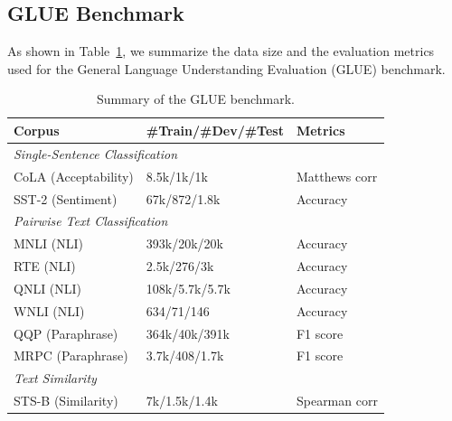 \documentclass{article}
\begin{document}
\begin{appendices}
\section{GLUE Benchmark}

As shown in Table~\ref{tbl:glue:datasets}, we summarize the data size and the evaluation metrics used for the General Language Understanding Evaluation (GLUE) benchmark.

\begin{table}[t]
\centering
\small
\begin{tabular}{@{\hskip3pt}l@{\hskip3pt} @{\hskip3pt}l@{\hskip3pt} @{\hskip3pt}l@{\hskip3pt}}
\toprule \textbf{Corpus} & \textbf{\#Train/\#Dev/\#Test}   &\textbf{Metrics}\\ \midrule
\multicolumn{3}{l}{\emph{Single-Sentence Classification}} \\
CoLA (Acceptability)&8.5k/1k/1k & Matthews corr\\
SST-2 (Sentiment)&67k/872/1.8k & Accuracy\\ \midrule
\multicolumn{3}{l}{\emph{Pairwise Text Classification}} \\
MNLI (NLI)& 393k/20k/20k& Accuracy\\
RTE (NLI) &2.5k/276/3k & Accuracy \\ 
QNLI (NLI)& 108k/5.7k/5.7k& Accuracy\\
WNLI (NLI) &634/71/146& Accuracy \\ 
QQP (Paraphrase)&364k/40k/391k& F1 score\\ 
MRPC (Paraphrase) &3.7k/408/1.7k&F1 score\\ \midrule
\multicolumn{3}{l}{\emph{Text Similarity}} \\
STS-B (Similarity) &7k/1.5k/1.4k & Spearman corr\\ \bottomrule
\end{tabular}
\caption{Summary of the GLUE benchmark.
}
\label{tbl:glue:datasets}
\end{table}

\end{appendices}
\end{document}
